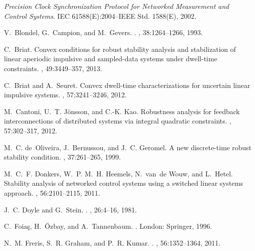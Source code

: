 \documentclass[letterpaper, 12pt, draftcls, onecolumn]{ieeeconf}
\begin{document}
\begin{thebibliography}{10}
	
	{\em Precision Clock Synchronization Protocol for Networked Measurement and
		Control Systems}.
	\newblock IEC 61588(E):2004--IEEE Std. 1588(E), 2002.
	
	V.~Blondel, G.~Campion, and M.~Gevers.
	.
	, 38:1264--1266, 1993.
	
	C.~Briat.
	\newblock Convex conditions for robust stability analysis and stabilization of
	linear aperiodic impulsive and sampled-data systems under dwell-time
	constraints.
	, 49:3449--357, 2013.
	
	C.~Briat and A.~Seuret.
	\newblock Convex dwell-time characterizations for uncertain linear impulsive
	systems.
	, 57:3241--3246, 2012.
	
	M.~Cantoni, U.~T. J\"onsson, and C.-K. Kao.
	\newblock Robustness analysis for feedback interconnections of distributed
	systems via integral quadratic constraints.
	, 57:302--317, 2012.
	
	M.~C. de~Oliveira, J.~Bernussou, and J.~C. Geromel.
	\newblock A new discrete-time robust stability condition.
	, 37:261--265, 1999.
	
	M.~C.~F. Donkers, W.~P. M.~H. Heemels, N.~van~de Wouw, and L.~Hetel.
	\newblock Stability analysis of networked control systems using a switched
	linear systems approach.
	, 56:2101--2115, 2011.
	
	J.~C. Doyle and G.~Stein.
	.
	, 26:4--16, 1981.
	
	C.~Foia\c{s}, H.~\"Ozbay, and A.~Tannenbaum.
	.
	\newblock London: Springer, 1996.
	
	N.~M. Freris, S.~R. Graham, and P.~R. Kumar.
	.
	, 56:1352--1364, 2011.
	

\end{thebibliography}
\end{document}
